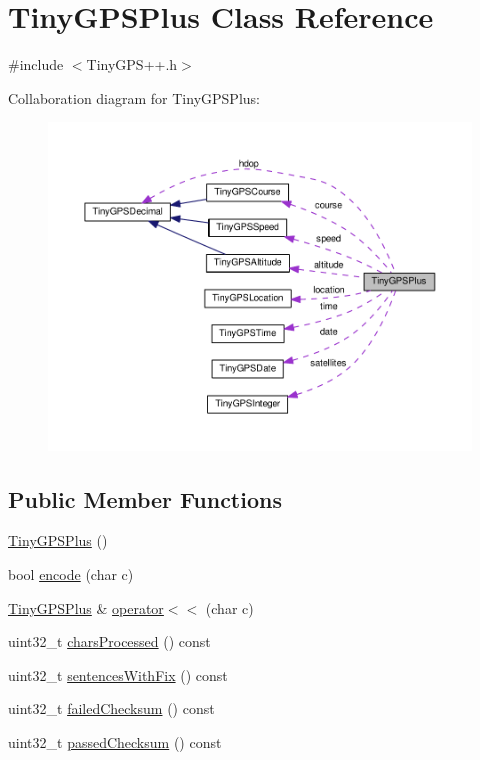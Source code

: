 \hypertarget{class_tiny_g_p_s_plus}{}\section{Tiny\+G\+P\+S\+Plus Class Reference}
\label{class_tiny_g_p_s_plus}


{\ttfamily \#include $<$Tiny\+G\+P\+S++.\+h$>$}



Collaboration diagram for Tiny\+G\+P\+S\+Plus\+:\nopagebreak
\begin{figure}[H]
\begin{center}
\leavevmode
\includegraphics[width=350pt]{class_tiny_g_p_s_plus__coll__graph}
\end{center}
\end{figure}
\subsection*{Public Member Functions}
\begin{DoxyCompactItemize}
\item 
\hyperlink{class_tiny_g_p_s_plus_a3d9173312d514abf50bd43efe6bf6af3}{Tiny\+G\+P\+S\+Plus} ()
\item 
bool \hyperlink{class_tiny_g_p_s_plus_ad7b78320b7e4967df17c6a27008a5154}{encode} (char c)
\item 
\hyperlink{class_tiny_g_p_s_plus}{Tiny\+G\+P\+S\+Plus} \& \hyperlink{class_tiny_g_p_s_plus_a32a0b61a25ce0c490216cb2b4ea19ced}{operator$<$$<$} (char c)
\item 
uint32\+\_\+t \hyperlink{class_tiny_g_p_s_plus_a12b6bc0169ee6b2f0beb8041e549f338}{chars\+Processed} () const 
\item 
uint32\+\_\+t \hyperlink{class_tiny_g_p_s_plus_a6c502ec591dc42a83771a502c4dbdcd4}{sentences\+With\+Fix} () const 
\item 
uint32\+\_\+t \hyperlink{class_tiny_g_p_s_plus_a57dd7a4430d58f784e967ee2d76e574f}{failed\+Checksum} () const 
\item 
uint32\+\_\+t \hyperlink{class_tiny_g_p_s_plus_a55af5d3442bf8f5c5fdd0309e416d9e5}{passed\+Checksum} () const 
\end{DoxyCompactItemize}

